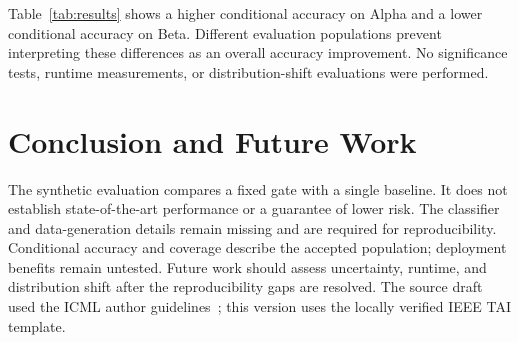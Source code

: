 Table~\ref{tab:results} shows a higher conditional accuracy on Alpha and a lower
conditional accuracy on Beta. Different evaluation populations prevent interpreting
these differences as an overall accuracy improvement. No significance tests,
runtime measurements, or distribution-shift evaluations were performed.
\section{Conclusion and Future Work}
The synthetic evaluation compares a fixed gate with a single baseline. It does
not establish state-of-the-art performance or a guarantee of lower risk.
The classifier and data-generation details remain missing and are required for
reproducibility. Conditional accuracy and coverage describe the accepted
population; deployment benefits remain untested.
Future work should assess uncertainty, runtime, and distribution shift after
the reproducibility gaps are resolved. The source draft used the ICML author guidelines~\cite{formatguide};
this version uses the locally verified IEEE TAI template.
\label{pw:main-end}
